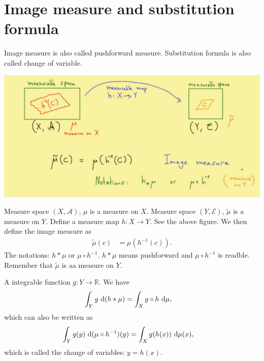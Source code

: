 \documentclass[../../note.tex]{subfiles}
\begin{document}
\section{Image measure and substitution formula}
Image measure is also called pushforward measure. Substitution formula is also called change of variable.

\includegraphics[scale=0.4]{Image measure.png}

\begin{definition}
    Measure space $(X, \mathcal{A})$, $\mu$ is a measure on $X$. Measure space $(Y, \mathcal{E})$, $\tilde{\mu}$ is a measure on $Y$. Define a measure map $h: X \rightarrow Y$. See the above figure. We then define the image measure as
    \begin{align}
        \tilde{\mu}(c)
        &= \mu(h^{-1}(c)).
    \end{align}
    The notations: $h * \mu$ or $\mu \circ h^{-1}$. $h * \mu$ means pushforward and $\mu \circ h^{-1}$ is readble. Remember that $\tilde{\mu}$ is aa measure on $Y$.    
\end{definition}

\begin{lemma}
    \label{lemma: substitution formula}
    A integrable function $g: Y \rightarrow \mathbb{R}$. We have 
    \begin{align}
        \int_Y g~{\rm d}(h * \mu) 
        &= \int_X g \circ h~{\rm d}\mu,
    \end{align}
    which can also be written as
    \begin{align}
        \int_Y g(y)~{\rm d}(\mu \circ h^{-1})(y) 
        &= \int_X g(h(x))~{\rm d}\mu(x),
    \end{align}
    which is called the change of variables: $y = h(x)$.
\end{lemma}
\end{document}
